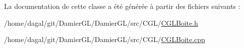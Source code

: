 La documentation de cette classe a été générée à partir des fichiers suivants \-:\begin{DoxyCompactItemize}
\item 
/home/dagal/git/\-Damier\-G\-L/\-Damier\-G\-L/src/\-C\-G\-L/\hyperlink{_c_g_l_boite_8h}{C\-G\-L\-Boite.\-h}\item 
/home/dagal/git/\-Damier\-G\-L/\-Damier\-G\-L/src/\-C\-G\-L/\hyperlink{_c_g_l_boite_8cpp}{C\-G\-L\-Boite.\-cpp}\end{DoxyCompactItemize}
